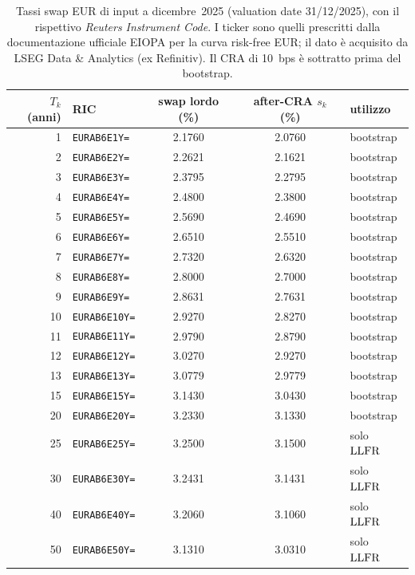 \begin{table}[H]\centering\small
\caption{Tassi swap EUR di input a dicembre~2025 (valuation date 31/12/2025), con il rispettivo \emph{Reuters Instrument Code}. I ticker sono quelli prescritti dalla documentazione ufficiale EIOPA per la curva risk-free EUR; il dato \`e acquisito da LSEG Data \& Analytics (ex Refinitiv). Il CRA di 10~bps \`e sottratto prima del bootstrap.}
\label{tab:input-ric-dic}\renewcommand{\arraystretch}{1.15}
\begin{tabular}{rlccl}
\toprule
$T_k$ (anni) & RIC & swap lordo (\%) & after-CRA $s_k$ (\%) & utilizzo\\
\midrule
\rowcolor{rowtint}1 & \texttt{EURAB6E1Y=} & 2.1760 & 2.0760 & bootstrap\\
2 & \texttt{EURAB6E2Y=} & 2.2621 & 2.1621 & bootstrap\\
\rowcolor{rowtint}3 & \texttt{EURAB6E3Y=} & 2.3795 & 2.2795 & bootstrap\\
4 & \texttt{EURAB6E4Y=} & 2.4800 & 2.3800 & bootstrap\\
\rowcolor{rowtint}5 & \texttt{EURAB6E5Y=} & 2.5690 & 2.4690 & bootstrap\\
6 & \texttt{EURAB6E6Y=} & 2.6510 & 2.5510 & bootstrap\\
\rowcolor{rowtint}7 & \texttt{EURAB6E7Y=} & 2.7320 & 2.6320 & bootstrap\\
8 & \texttt{EURAB6E8Y=} & 2.8000 & 2.7000 & bootstrap\\
\rowcolor{rowtint}9 & \texttt{EURAB6E9Y=} & 2.8631 & 2.7631 & bootstrap\\
10 & \texttt{EURAB6E10Y=} & 2.9270 & 2.8270 & bootstrap\\
\rowcolor{rowtint}11 & \texttt{EURAB6E11Y=} & 2.9790 & 2.8790 & bootstrap\\
12 & \texttt{EURAB6E12Y=} & 3.0270 & 2.9270 & bootstrap\\
\rowcolor{rowtint}13 & \texttt{EURAB6E13Y=} & 3.0779 & 2.9779 & bootstrap\\
15 & \texttt{EURAB6E15Y=} & 3.1430 & 3.0430 & bootstrap\\
\rowcolor{rowtint}20 & \texttt{EURAB6E20Y=} & 3.2330 & 3.1330 & bootstrap\\
25 & \texttt{EURAB6E25Y=} & 3.2500 & 3.1500 & solo $\mathrm{LLFR}$\\
\rowcolor{rowtint}30 & \texttt{EURAB6E30Y=} & 3.2431 & 3.1431 & solo $\mathrm{LLFR}$\\
40 & \texttt{EURAB6E40Y=} & 3.2060 & 3.1060 & solo $\mathrm{LLFR}$\\
\rowcolor{rowtint}50 & \texttt{EURAB6E50Y=} & 3.1310 & 3.0310 & solo $\mathrm{LLFR}$\\
\bottomrule
\end{tabular}
\end{table}
